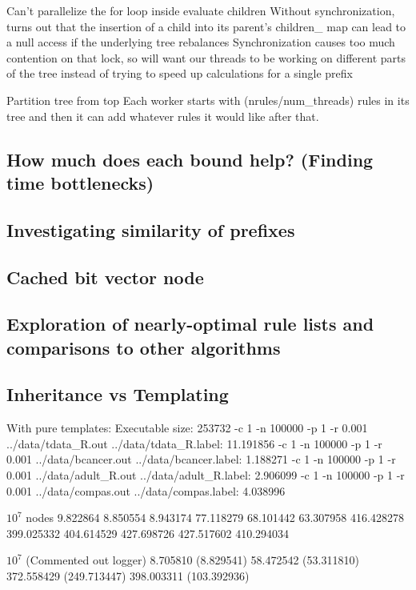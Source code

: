 \documentclass[]{article}
\theoremstyle{definition}
\begin{document}
Can't parallelize the for loop inside evaluate children
	Without synchronization, turns out that the insertion of a child into its parent's children\_ map can lead to a null access if the underlying tree rebalances
	Synchronization causes too much contention on that lock, so will want our threads to be working on different parts of the tree instead of trying to speed up calculations for a single prefix

Partition tree from top
	Each worker starts with (nrules/num\_threads) rules in its tree and then it can add whatever rules it would like after that.

\subsection{How much does each bound help? (Finding time bottlenecks)}

\subsection{Investigating similarity of prefixes}

\subsection{Cached bit vector node}

\subsection{Exploration of nearly-optimal rule lists and comparisons to other algorithms}

\subsection{Inheritance vs Templating}


With pure templates:
Executable size: 253732
-c 1 -n 100000 -p 1 -r 0.001 ../data/tdata\_R.out ../data/tdata\_R.label: 11.191856
-c 1 -n 100000 -p 1 -r 0.001 ../data/bcancer.out ../data/bcancer.label: 1.188271
-c 1 -n 100000 -p 1 -r 0.001 ../data/adult\_R.out ../data/adult\_R.label: 2.906099
-c 1 -n 100000 -p 1 -r 0.001 ../data/compas.out ../data/compas.label: 4.038996

$10^7$ nodes
9.822864 8.850554 8.943174
77.118279 68.101442 63.307958
416.428278 399.025332 404.614529
427.698726 427.517602 410.294034

$10^7$ (Commented out logger)
8.705810 (8.829541)
58.472542 (53.311810)
372.558429 (249.713447)
398.003311 (103.392936)
\end{document}
